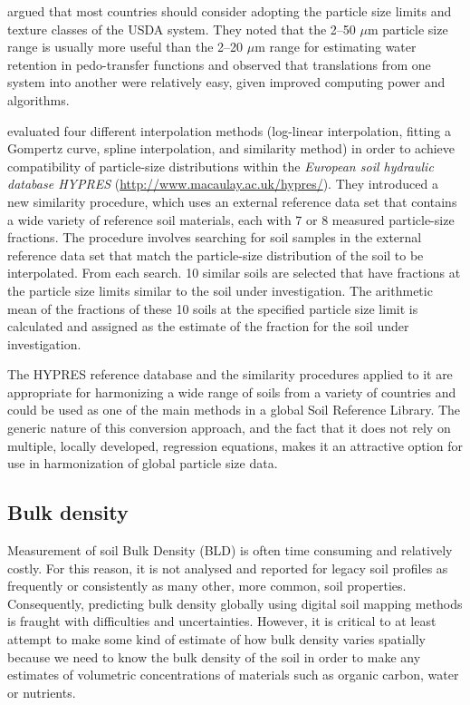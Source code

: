 \documentclass[11pt]{krantz}
\theoremstyle{definition}
\theoremstyle{definition}
\theoremstyle{definition}
\theoremstyle{remark}
\begin{document}
\citet{Minasny2001AJSR} argued that most countries should consider
adopting the particle size limits and texture classes of the USDA
system. They noted that the 2--50 \(\mu\)m particle size range is
usually more useful than the 2--20 \(\mu\)m range for estimating water
retention in pedo-transfer functions and observed that translations from
one system into another were relatively easy, given improved computing
power and algorithms.

\citeauthor{Nemes1999}
\citetext{\citeyear{Nemes1999}; \citealp{Nemes1999G}} evaluated four
different interpolation methods (log-linear interpolation, fitting a
Gompertz curve, spline interpolation, and similarity method) in order to
achieve compatibility of particle-size distributions within the
\emph{European soil hydraulic database HYPRES}
(\url{http://www.macaulay.ac.uk/hypres/}). They introduced a new
similarity procedure, which uses an external reference data set that
contains a wide variety of reference soil materials, each with 7 or 8
measured particle-size fractions. The procedure involves searching for
soil samples in the external reference data set that match the
particle-size distribution of the soil to be interpolated. From each
search. 10 similar soils are selected that have fractions at the
particle size limits similar to the soil under investigation. The
arithmetic mean of the fractions of these 10 soils at the specified
particle size limit is calculated and assigned as the estimate of the
fraction for the soil under investigation.

The HYPRES reference database and the similarity procedures applied to
it are appropriate for harmonizing a wide range of soils from a variety
of countries and could be used as one of the main methods in a global
Soil Reference Library. The generic nature of this conversion approach,
and the fact that it does not rely on multiple, locally developed,
regression equations, makes it an attractive option for use in
harmonization of global particle size data.

\hypertarget{bulk-density}{%
\subsection{Bulk density}\label{bulk-density}}

Measurement of soil Bulk Density (BLD) is often time consuming and
relatively costly. For this reason, it is not analysed and reported for
legacy soil profiles as frequently or consistently as many other, more
common, soil properties. Consequently, predicting bulk density globally
using digital soil mapping methods is fraught with difficulties and
uncertainties. However, it is critical to at least attempt to make some
kind of estimate of how bulk density varies spatially because we need to
know the bulk density of the soil in order to make any estimates of
volumetric concentrations of materials such as organic carbon, water or
nutrients.
\end{document}
